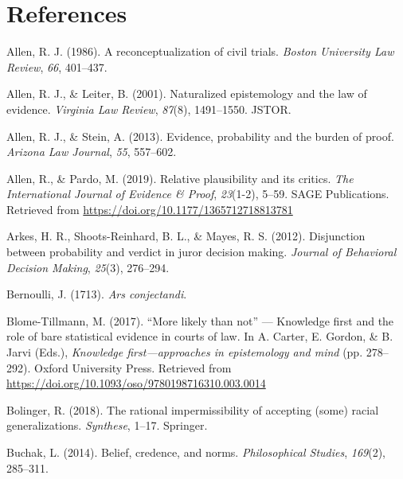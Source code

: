 \documentclass[10pt,dvipsnames,enabledeprecatedfontcommands]{scrartcl}
\begin{document}
\hypertarget{references}{%
\section*{References}\label{references}}

\hypertarget{refs}{}
\leavevmode\hypertarget{ref-Allen1986A-Reconceptuali}{}%
Allen, R. J. (1986). A reconceptualization of civil trials. \emph{Boston
University Law Review}, \emph{66}, 401--437.

\leavevmode\hypertarget{ref-allen2001naturalized}{}%
Allen, R. J., \& Leiter, B. (2001). Naturalized epistemology and the law
of evidence. \emph{Virginia Law Review}, \emph{87}(8), 1491--1550.
JSTOR.

\leavevmode\hypertarget{ref-allen2013}{}%
Allen, R. J., \& Stein, A. (2013). Evidence, probability and the burden
of proof. \emph{Arizona Law Journal}, \emph{55}, 557--602.

\leavevmode\hypertarget{ref-AllenPardo2019relative}{}%
Allen, R., \& Pardo, M. (2019). Relative plausibility and its critics.
\emph{The International Journal of Evidence \& Proof}, \emph{23}(1-2),
5--59. SAGE Publications. Retrieved from
\url{https://doi.org/10.1177/1365712718813781}

\leavevmode\hypertarget{ref-arkesEtAl2012}{}%
Arkes, H. R., Shoots-Reinhard, B. L., \& Mayes, R. S. (2012).
Disjunction between probability and verdict in juror decision making.
\emph{Journal of Behavioral Decision Making}, \emph{25}(3), 276--294.

\leavevmode\hypertarget{ref-Bernoulli1713Ars-conjectandi}{}%
Bernoulli, J. (1713). \emph{Ars conjectandi}.

\leavevmode\hypertarget{ref-BlomeTillmann2017}{}%
Blome-Tillmann, M. (2017). ``More likely than not'' --- Knowledge first
and the role of bare statistical evidence in courts of law. In A.
Carter, E. Gordon, \& B. Jarvi (Eds.), \emph{Knowledge
first---approaches in epistemology and mind} (pp. 278--292). Oxford
University Press. Retrieved from
\url{https://doi.org/10.1093/oso/9780198716310.003.0014}

\leavevmode\hypertarget{ref-bolinger2018rational}{}%
Bolinger, R. (2018). The rational impermissibility of accepting (some)
racial generalizations. \emph{Synthese}, 1--17. Springer.

\leavevmode\hypertarget{ref-buchak2014belief}{}%
Buchak, L. (2014). Belief, credence, and norms. \emph{Philosophical
Studies}, \emph{169}(2), 285--311.
\end{document}
